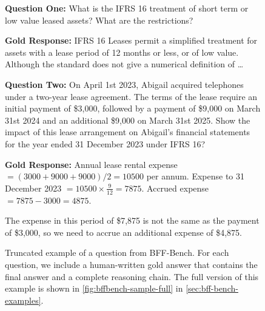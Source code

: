 

\begin{figure}[t]
\centering
\footnotesize

\begin{tcolorbox}[
    boxsep=0.5pt,
    left=1pt,right=1pt,top=1pt,bottom=1pt,
    colback=blue!5!white,
    colframe=blue!40!black,
    before skip=1pt,
    after skip=1pt,
    sharp corners=downhill
]
\textbf{Question One:} What is the IFRS 16 treatment of short term or low value leased assets? What are the restrictions?
\end{tcolorbox}

\begin{tcolorbox}[
    boxsep=0.5pt,
    left=1pt,right=1pt,top=1pt,bottom=1pt,
    colback=green!2!white,
    colframe=green!25!black,
    before skip=1pt,
    after skip=1pt,
    sharp corners=downhill
]
\textbf{Gold Response:} IFRS 16 Leases permit a simplified treatment for assets with a lease period of 12 months or less, or of low value. Although the standard does not give a numerical definition of \dots
\end{tcolorbox}

\begin{tcolorbox}[
    boxsep=0.5pt,
    left=1pt,right=1pt,top=1pt,bottom=1pt,
    colback=blue!5!white,
    colframe=blue!40!black,
    before skip=1pt,
    after skip=1pt,
    sharp corners=downhill,
]
\textbf{Question Two:} On April 1st 2023, Abigail acquired telephones under a two-year lease agreement. The terms of the lease require an initial payment of \$3,000, followed by a payment of \$9,000 on March 31st 2024 and an additional \$9,000 on March 31st 2025. Show the impact of this lease arrangement on Abigail's financial statements for the year ended 31 December 2023 under IFRS 16?
\end{tcolorbox}

\begin{tcolorbox}[
    boxsep=0.5pt,
    left=1pt,right=1pt,top=1pt,bottom=1pt,
    colback=green!2!white,
    colframe=green!25!black,
    before skip=1pt,
    after skip=1pt,
    sharp corners=downhill,
]
\textbf{Gold Response:}
Annual lease rental expense $= (3000 + 9000 + 9000)/2 = 10500$ per annum.
Expense to 31 December 2023 $= 10500 \times \frac{9}{12} = 7875$.
Accrued expense $= 7875 - 3000 = 4875$.

The expense in this period of \$7,875 is not the same as the payment of \$3,000, so we need to accrue an additional expense of \$4,875.
\end{tcolorbox}

\caption{Truncated example of a question from BFF-Bench. For each question, we include a human-written gold answer that contains the final answer and a complete reasoning chain. The full version of this example is shown in \cref{fig:bffbench-sample-full} in \cref{sec:bff-bench-examples}.}
\label{fig:bffbench-sample}
\end{figure}
